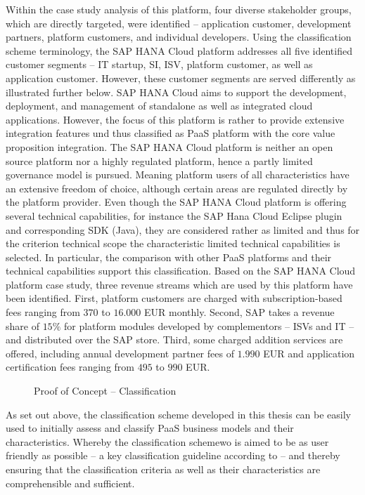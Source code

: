 Within the case study analysis of this platform, four diverse stakeholder groups, which are directly targeted, were identified -- application customer, development partners, platform customers, and individual developers. Using the classification scheme terminology, the SAP HANA Cloud platform addresses all five identified customer segments -- \ac{IT} startup, \ac{SI}, \ac{ISV}, platform customer, as well as application customer. However, these customer segments are served differently as illustrated further below. SAP HANA Cloud aims to support the development, deployment, and management of standalone as well as integrated cloud applications. However, the focus of this platform is rather to provide extensive integration features und thus classified as \ac{PaaS} platform with the core value proposition integration. The SAP HANA Cloud platform is neither an open source platform nor a highly regulated platform, hence a partly limited governance model is pursued. Meaning platform users of all characteristics have an extensive freedom of choice, although certain areas are regulated directly by the platform provider. Even though the SAP HANA Cloud platform is offering several technical capabilities, for instance the SAP Hana Cloud Eclipse plugin and corresponding \ac{SDK} (Java), they are considered rather as limited and thus for the criterion technical scope the characteristic limited technical capabilities is selected. In particular, the comparison with other \ac{PaaS} platforms and their technical capabilities support this classification. Based on the SAP HANA Cloud platform case study, three revenue streams which are used by this platform have been identified. First, platform customers are charged with subscription-based fees ranging from $370$ to $16.000$ \ac{EUR} monthly. Second, SAP takes a revenue share of $15\%$ for platform modules developed by complementors -- \acp{ISV} and \ac{IT} -- and distributed over the SAP store. Third, some charged addition services are offered, including annual development partner fees of $1.990$ \ac{EUR} and application certification fees ranging from $495$ to $990$ \ac{EUR}.

\begin{figure}[tb]
	\centering
	
	\caption{Proof of Concept -- Classification}
	\label{fig:cs:sap}
\end{figure}

As set out above, the classification scheme developed in this thesis can be easily used to initially assess and classify \ac{PaaS} business models and their characteristics. Whereby the classification schemewo is aimed to be as user friendly as possible -- a key classification guideline according to \citet[p. 41]{Fettke2003} -- and thereby ensuring that the classification criteria as well as their characteristics are comprehensible and sufficient.

